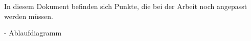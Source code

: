 
In diesem Dokument befinden sich Punkte, die bei der Arbeit noch angepasst werden müssen.


- Ablaufdiagramm